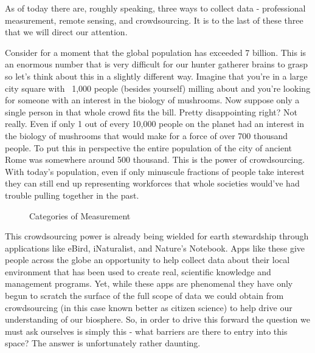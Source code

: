 \documentclass[10pt,a5paper]{book}
\begin{document}
As of today there are, roughly speaking, three ways to collect data - professional measurement, remote sensing, and crowdsourcing. It is to the last of these three that we will direct our attention. 

Consider for a moment that the global population has exceeded 7 billion. This is an enormous number that is very difficult for our hunter gatherer brains to grasp so let’s think about this in a slightly different way. Imagine that you’re in a large city square with ~1,000 people (besides yourself) milling about and you’re looking for someone with an interest in the biology of mushrooms. Now suppose only a single person in that whole crowd fits the bill. Pretty disappointing right? Not really. Even if only 1 out of every 10,000 people on the planet had an interest in the biology of mushrooms that would make for a force of over 700 thousand people. To put this in perspective the entire population of the city of ancient Rome was somewhere around 500 thousand. This is the power of crowdsourcing. With today’s population, even if only minuscule fractions of people take interest they can still end up representing workforces that whole societies would’ve had trouble pulling together in the past. 


\begin{figure}[!htb]
\caption{\label{fig:my-label} Categories of Measurement}
\end{figure}


This crowdsourcing power is already being wielded for earth stewardship through applications like eBird, iNaturalist, and Nature’s Notebook. Apps like these give people across the globe an opportunity to help collect data about their local environment that has been used to create real, scientific knowledge and management programs. Yet, while these apps are phenomenal they have only begun to scratch the surface of the full scope of data we could obtain from crowdsourcing (in this case known better as citizen science) to help drive our understanding of our biosphere. So, in order to drive this forward the question we must ask ourselves is simply this - what barriers are there to entry into this space? The answer is unfortunately rather daunting.
\end{document}
